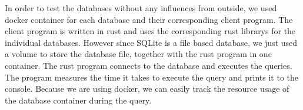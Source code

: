 In order to test the databases without any influences from outside, we used docker container for each database and their corresponding client program. The client program
is written in rust and uses the corresponding rust librarys for the individual databases. However since SQLite is a file based database, we just used a volume to store the
database file, together with the rust program in one container. The rust program connects to the database and executes the queries. The program measures the time it 
takes to execute the query and prints it to the console. Because we are using docker, we can easily track the resource usage of the database container during the query. 

\filbreak